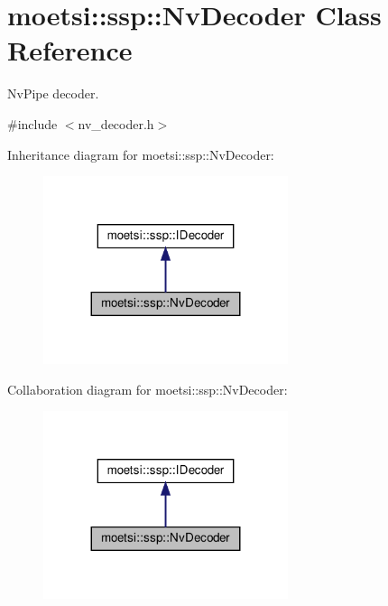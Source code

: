 \hypertarget{classmoetsi_1_1ssp_1_1NvDecoder}{}\section{moetsi\+:\+:ssp\+:\+:Nv\+Decoder Class Reference}
\label{classmoetsi_1_1ssp_1_1NvDecoder}


Nv\+Pipe decoder.  




{\ttfamily \#include $<$nv\+\_\+decoder.\+h$>$}



Inheritance diagram for moetsi\+:\+:ssp\+:\+:Nv\+Decoder\+:\nopagebreak
\begin{figure}[H]
\begin{center}
\leavevmode
\includegraphics[width=203pt]{classmoetsi_1_1ssp_1_1NvDecoder__inherit__graph}
\end{center}
\end{figure}


Collaboration diagram for moetsi\+:\+:ssp\+:\+:Nv\+Decoder\+:\nopagebreak
\begin{figure}[H]
\begin{center}
\leavevmode
\includegraphics[width=203pt]{classmoetsi_1_1ssp_1_1NvDecoder__coll__graph}
\end{center}
\end{figure}
